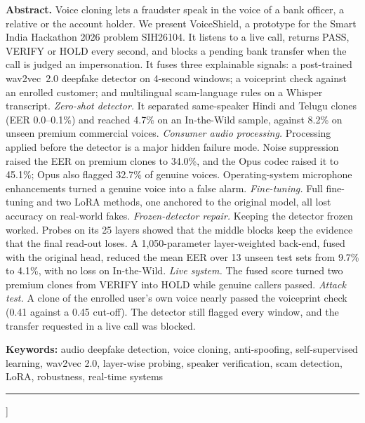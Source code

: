 \documentclass[10pt,a4paper,twocolumn]{article}
\begin{document}
\begin{minipage}{\textwidth}
\small
\noindent\textbf{Abstract.} Voice cloning lets a fraudster speak in the voice of a bank officer, a relative or the account holder.
We present VoiceShield, a prototype for the Smart India Hackathon 2026 problem SIH26104. It listens to a live call, returns PASS, VERIFY or HOLD every second, and blocks a pending bank transfer when the call is judged an impersonation.
It fuses three explainable signals:
a post-trained wav2vec~2.0 deepfake detector on 4-second windows;
a voiceprint check against an enrolled customer;
and multilingual scam-language rules on a Whisper transcript.
\emph{Zero-shot detector.} It separated same-speaker Hindi and Telugu clones (EER 0.0--0.1\%) and reached 4.7\% on an In-the-Wild sample, against 8.2\% on unseen premium commercial voices.
\emph{Consumer audio processing.} Processing applied before the detector is a major hidden failure mode.
Noise suppression raised the EER on premium clones to 34.0\%, and the Opus codec raised it to 45.1\%; Opus also flagged 32.7\% of genuine voices.
Operating-system microphone enhancements turned a genuine voice into a false alarm.
\emph{Fine-tuning.} Full fine-tuning and two LoRA methods, one anchored to the original model, all lost accuracy on real-world fakes.
\emph{Frozen-detector repair.} Keeping the detector frozen worked. Probes on its 25 layers showed that the middle blocks keep the evidence that the final read-out loses. A 1,050-parameter layer-weighted back-end, fused with the original head, reduced the mean EER over 13 unseen test sets from 9.7\% to 4.1\%, with no loss on In-the-Wild.
\emph{Live system.} The fused score turned two premium clones from VERIFY into HOLD while genuine callers passed.
\emph{Attack test.} A clone of the enrolled user's own voice nearly passed the voiceprint check (0.41 against a 0.45 cut-off). The detector still flagged every window, and the transfer requested in a live call was blocked.

\smallskip
\noindent\textbf{Keywords:} audio deepfake detection, voice cloning, anti-spoofing, self-supervised learning, wav2vec 2.0, layer-wise probing, speaker verification, scam detection, LoRA, robustness, real-time systems
\end{minipage}
\vspace{2pt}

\noindent\rule{\textwidth}{0.4pt}
\vspace{6pt}
]

\end{document}
